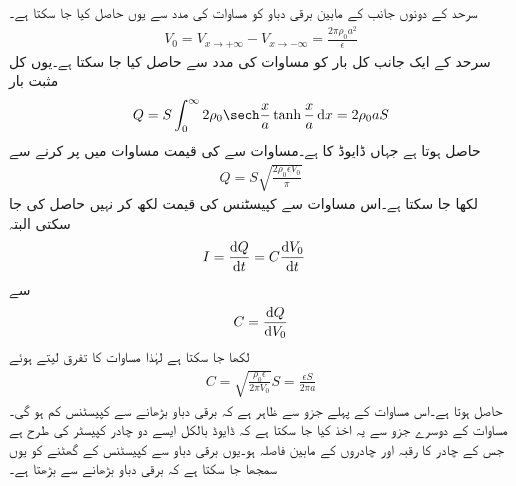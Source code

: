 سرحد کے دونوں جانب کے مابین برقی دباو  کو مساوات  کی مدد سے یوں حاصل کیا جا سکتا ہے۔
\begin{align}\label{مساوات_لاپلاس_ڈایوڈ_اندرونی_دباو}
V_0=V_{x \to +\infty}-V_{x \to -\infty}=\frac{2\pi\rho_0 a^2}{\epsilon}
\end{align}
سرحد کے ایک جانب کل بار کو مساوات  کی مدد سے حاصل کیا جا سکتا ہے۔یوں کل مثبت بار
\begin{align}\label{مساوات_لاپلاس_ڈایوڈ_کل_بار_الف}
Q=S \int_0^{\infty} 2 \rho_0 \sech \frac{x}{a}\tanh \frac{x}{a} \dif x=2\rho_0 a S
\end{align}
حاصل ہوتا ہے جہاں ڈایوڈ کا   ہے۔مساوات  سے  کی قیمت مساوات  میں پر کرنے سے
\begin{align}\label{مساوات_لاپلاس_ڈایوڈ_کل_بار_ب}
Q=S \sqrt{\frac{2\rho_0 \epsilon V_0}{\pi}}
\end{align} 
لکھا جا سکتا ہے۔اس مساوات سے کپیسٹنس کی قیمت  لکھ کر نہیں حاصل کی جا سکتی البتہ
\begin{align*}
I&=\frac{\dif Q}{\dif t} =C \frac{\dif V_0}{\dif t}
\end{align*}
سے
\begin{align*}
C=\frac{\dif Q}{\dif V_0}
\end{align*}
لکھا جا سکتا ہے  لہٰذا مساوات  کا تفرق لیتے ہوئے
\begin{align*}
C=\sqrt{\frac{\rho_0 \epsilon}{2\pi V_0}} S=\frac{\epsilon S}{2\pi a}
\end{align*}
حاصل ہوتا ہے۔اس مساوات  کے پہلے جزو سے ظاہر ہے کہ برقی دباو بڑھانے سے کپیسٹنس کم ہو گی۔مساوات کے دوسرے جزو سے یہ اخذ کیا جا سکتا ہے کہ ڈایوڈ بالکل ایسے  دو چادر کپیسٹر کی طرح ہے جس کے چادر کا رقبہ  اور چادروں کے مابین فاصلہ   ہو۔یوں برقی دباو سے کپیسٹنس کے گھٹنے کو یوں سمجھا جا سکتا ہے کہ برقی دباو بڑھانے سے   بڑھتا ہے۔ 

